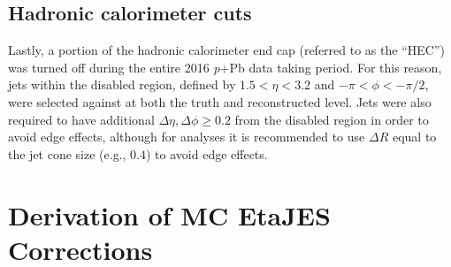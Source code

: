 \documentclass[NOTE, atlasdraft=true, texlive=2016, USenglish]{\ATLASLATEXPATH atlasdoc}
\begin{document}
\subsection{Hadronic calorimeter cuts}
Lastly, a portion of the hadronic calorimeter end cap (referred to as the ``HEC'') was turned off during the entire 2016 \textit{p}+Pb data taking period. For this reason, jets within the disabled region, defined by $1.5<\eta<3.2$ and $-\pi<\phi<-\pi/2$, were selected against at both the truth and reconstructed level. Jets were also required to have additional $\Delta\eta, \Delta\phi \geq 0.2$ from the disabled region in order to avoid edge effects, although for analyses it is recommended to use $\Delta R$ equal to the jet cone size (e.g., $0.4$) to avoid edge effects.

%


\section{Derivation of MC EtaJES Corrections}
\label{sec:EtaJES}
\end{document}
